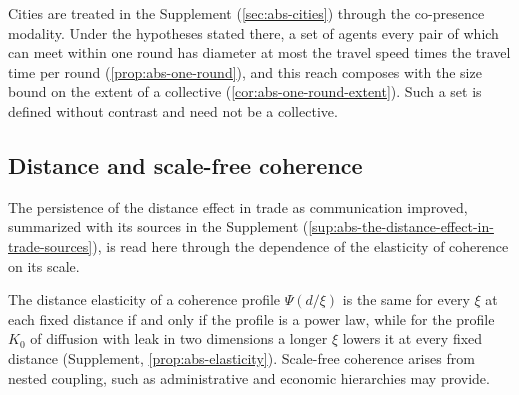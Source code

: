 Cities are treated in the Supplement (\cref{sec:abs-cities}) through the co-presence modality. Under the hypotheses stated there, a set of agents every pair of which can meet within one round has diameter at most the travel speed times the travel time per round (\cref{prop:abs-one-round}), and this reach composes with the size bound on the extent of a collective (\cref{cor:abs-one-round-extent}). Such a set is defined without contrast and need not be a collective.

\subsection{Distance and scale-free coherence}\label{sec:abs-distance}

The persistence of the distance effect in trade as communication improved, summarized with its sources in the Supplement (\cref{sup:abs-the-distance-effect-in-trade-sources}), is read here through the dependence of the elasticity of coherence on its scale.

The distance elasticity of a coherence profile $\Psi(d/\xi)$ is the same for every $\xi$ at each fixed distance if and only if the profile is a power law, while for the profile $K_0$ of diffusion with leak in two dimensions a longer $\xi$ lowers it at every fixed distance (Supplement, \cref{prop:abs-elasticity}). Scale-free coherence arises from nested coupling, such as administrative and economic hierarchies may provide.

